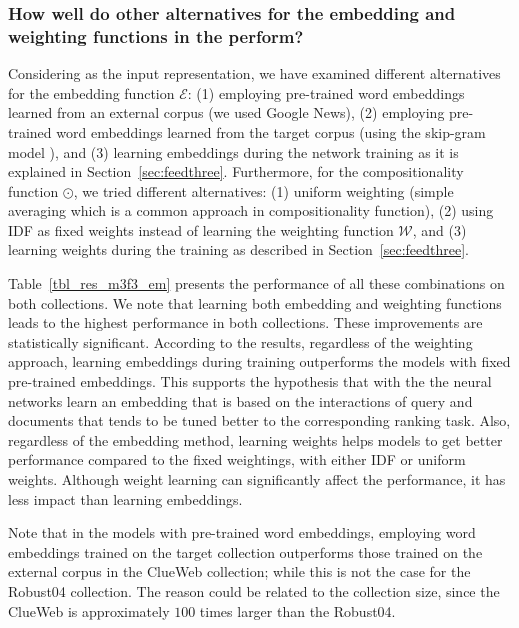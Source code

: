 \subsubsection{How well do other alternatives for the embedding and weighting functions in the \feedthree perform?}
Considering \feedthree as the input representation, we have examined different alternatives for the embedding function $\mathcal{E}$: (1) employing pre-trained word embeddings learned from an external corpus (we used Google News), (2) employing pre-trained word embeddings learned from the target corpus (using the skip-gram model \cite{Mikolov:2013}), and (3) learning embeddings during the network training as it is explained in Section~\ref{sec:feedthree}. 
Furthermore, for the compositionality function $\odot$, we tried different alternatives: (1) uniform weighting (simple averaging which is a common approach in compositionality function), (2) using IDF as fixed weights instead of learning the weighting function $\mathcal{W}$, and (3) learning weights during the training as described in Section~\ref{sec:feedthree}.

Table~\ref{tbl_res_m3f3_em} presents the performance of all these combinations on both collections. 
We note that learning both embedding and weighting functions leads to the highest performance in both collections. These improvements are statistically significant.
%
According to the results, regardless of the weighting approach, learning embeddings during training outperforms the models with fixed pre-trained embeddings.
%
This supports the hypothesis that with the \feedthree the neural networks learn an embedding that is based on the interactions of query and documents that tends to be tuned better to the corresponding ranking task.
%
Also, regardless of the embedding method, learning weights helps models to get better performance compared to the fixed weightings, with either IDF or uniform weights. 
%
Although weight learning can significantly affect the performance, it has less impact than learning embeddings.

Note that in the models with pre-trained word embeddings, employing word embeddings trained on the target collection outperforms those trained on the external corpus in the ClueWeb collection; while this is not the case for the Robust04 collection. The reason could be related to the collection size, since the ClueWeb is approximately $100$ times larger than the Robust04.

